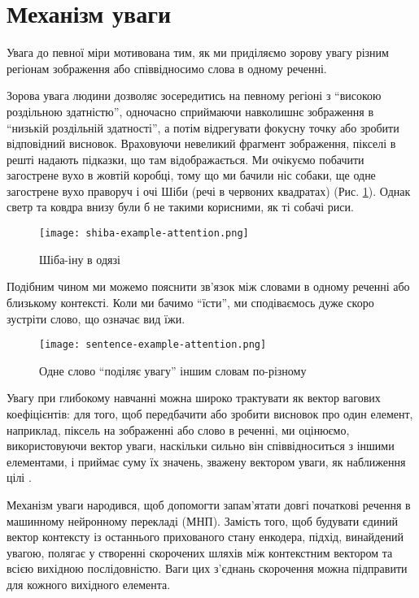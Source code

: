\section{Механізм уваги}
Увага до певної міри мотивована тим, як ми приділяємо зорову увагу
різним регіонам зображення або співвідносимо слова в одному реченні.

Зорова увага людини дозволяє зосередитись на певному регіоні з
``високою роздільною здатністю'', одночасно сприймаючи навколишнє
зображення в ``низькій роздільній здатності'', а потім відрегувати
фокусну точку або зробити відповідний висновок.
Враховуючи невеликий фрагмент зображення, пікселі в решті надають підказки, що
там відображається. Ми очікуємо побачити загострене вухо в жовтій коробці,
тому що ми бачили ніс собаки, ще одне загострене вухо праворуч і очі
Шіби (речі в червоних квадратах) (Рис. \ref{fig:shiba}). Однак
светр та ковдра внизу були
б не такими корисними, як ті собачі риси.

\begin{figure}[H]
    \centering
    \texttt{[image: shiba-example-attention.png]}
    \caption{Шіба-іну в одязі}
    \label{fig:shiba}
\end{figure}

Подібним чином ми можемо пояснити зв'язок між словами в одному реченні
або близькому контексті. Коли ми бачимо ``їсти'', ми сподіваємось дуже
скоро зустріти слово, що означає вид їжи.

\begin{figure}[H]
    \centering
    \texttt{[image: sentence-example-attention.png]}
    \caption{Одне слово ``поділяє увагу'' іншим словам по-різному}
    \label{fig:attend-example}
\end{figure}

Увагу при глибокому навчанні можна широко трактувати як вектор вагових
коефіцієнтів: для того, щоб передбачити або зробити висновок про один елемент,
наприклад, піксель на зображенні або слово в реченні, ми оцінюємо,
використовуючи вектор уваги, наскільки сильно він співвідноситься з іншими
елементами,
і приймає суму їх значень, зважену вектором уваги, як наближення
цілі \cite{attention}.

Механізм уваги народився, щоб допомогти запам’ятати довгі початкові
речення в машинному нейронному перекладі (МНП). Замість того,
щоб будувати єдиний вектор контексту із останнього прихованого стану
енкодера, підхід, винайдений увагою, полягає у створенні
скорочених шляхів між контекстним вектором та
всією вихідною послідовністю. Ваги цих з'єднань скорочення
можна підправити для кожного вихідного елемента.


